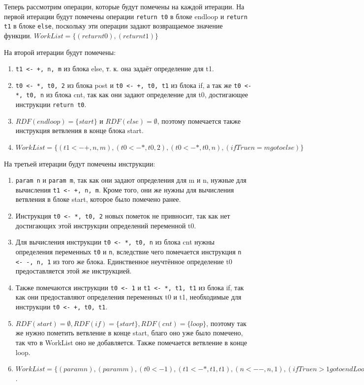 \documentclass[11pt]{article}
\begin{document}
Теперь рассмотрим операции, которые будут помечены на каждой итерации. На первой итерации будут помечены операции \texttt{return t0} в блоке endloop и \texttt{return t1} в блоке \texttt{else}, поскольку эти операции задают возвращаемое значение функции. \(WorkList = \{(return t0), (return t1)\}\)

На второй итерации будут помечены:
\begin{enumerate}
\item \texttt{t1 <- +, n, m} из блока else, т. к. она задаёт определение для t1.
\item \texttt{t0 <- *, t0, 2} из блока post и \texttt{t0 <- +, t0, t1} из блока if, а так же \texttt{t0 <- *, t0, n} из блока cnt, так как они задают определение для t0, достигающее инструкции \texttt{return t0}.
\item \(RDF(endloop) = \{start\}\) и \(RDF(else) = \emptyset\), поэтому помечается также инструкция ветвления в конце блока start.
\item \(WorkList = \{(t1 <- +, n, m), (t0 <- *, t0, 2), (t0 <- *, t0, n), (ifTrue n = m goto else)\}\)
\end{enumerate}

На третьей итерации будут помечены инструкции:
\begin{enumerate}
\item \texttt{param n} и \texttt{param m}, так как они задают определения для m и n, нужные для вычисления \texttt{t1 <- +, n, m}. Кроме того, они же нужны для вычисления ветвления в блоке start, которое было помечено ранее.
\item Инструкция \texttt{t0 <- *, t0, 2} новых пометок не привносит, так как нет достигающих этой инструкции определений переменной t0.
\item Для вычисления инструкции \texttt{t0 <- *, t0, n} из блока cnt нужны определения переменных \texttt{t0} и \texttt{n}, вследствие чего помечается инструкция \texttt{n <- -, n, 1} из того же блока. Единственное неучтённое определение t0 предоставляется этой же инструкцией.
\item Также помечаются инструкции \texttt{t0 <- 1} и \texttt{t1 <- *, t1, t1} из блока if, так как они предоставляют определения переменных t0 и t1, необходимые для инструкции \texttt{t0 <- +, t0, t1}.
\item \(RDF(start) = \emptyset, RDF(if) = \{start\}, RDF(cnt) = \{loop\}\), поэтому так же нужно пометить ветвление в конце start, благо оно уже было помечено, так что в WorkList оно не добавляется. Также помечается ветвление в конце loop.
\item \(WorkList = \{(param n), (param m), (t0 <- 1), (t1 <- *, t1, t1), (n <- -, n, 1), (ifTrue n > 1 goto endLoop)\}\).
\end{enumerate}
\end{document}
